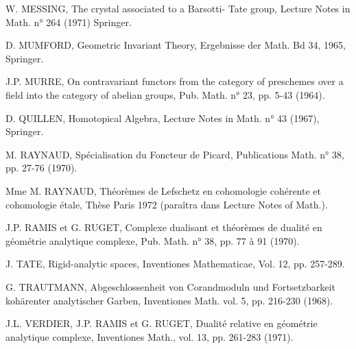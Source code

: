 
W. MESSING, The crystal associated to a Barsotti-%
Tate group, Lecture Notes in Math.
n° 264 (1971) Springer.

D. MUMFORD, Geometric Invariant Theory, Ergebnisse
der Math. Bd 34, 1965, Springer.

J.P. MURRE, On contravariant functors from the
category of preschemes over a field into
the category of abelian groups, Pub. Math.
n° 23, pp. 5-43 (1964).

D. QUILLEN, Homotopical Algebra, Lecture Notes in
Math. n° 43 (1967), Springer.

M. RAYNAUD, Spécialisation du Foncteur de Picard,
Publications Math. n° 38, pp. 27-76 (1970).

Mme M. RAYNAUD, Théorèmes de Lefschetz en cohomologie
cohérente et cohomologie étale, Thèse
Paris 1972 (paraîtra dans Lecture Notes
of Math.).

J.P. RAMIS et G. RUGET, Complexe dualisant et
théorèmes de dualité en géométrie analytique
complexe, Pub. Math. n° 38, pp. 77 à 91 (1970).

J. TATE, Rigid-analytic spaces, Inventiones Mathematicae,
Vol. 12, pp. 257-289.

G. TRAUTMANN, Abgeschlossenheit von Corandmoduln
und Fortsetzbarkeit kohärenter analytischer
Garben, Inventiones Math. vol. 5,
pp. 216-230 (1968).

J.L. VERDIER, J.P. RAMIS et G. RUGET, Dualité relative
en géométrie analytique complexe,
Inventiones Math., vol. 13, pp. 261-283 (1971).

